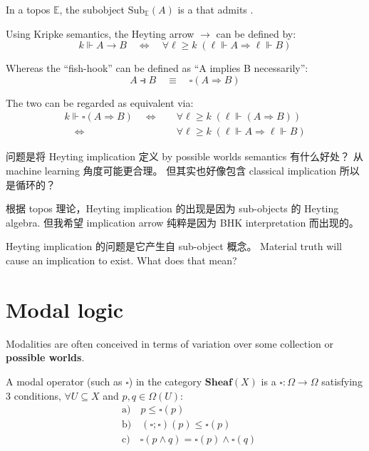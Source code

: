 In a topos $\mathbb{E}$, the subobject $\mathrm{Sub}_{\mathbb{E}}(A)$ is a  that admits .  

Using Kripke semantics, the Heyting arrow $\rightarrow$ can be defined by:
\begin{equation}
k \Vdash A \rightarrow B \quad \Leftrightarrow \quad \forall \ell \ge k \; (\ell \Vdash A \Rightarrow \ell \Vdash B)
\end{equation}

Whereas the ``fish-hook''  can be defined as ``A implies B necessarily'':
\begin{equation}
A \strictif B \quad \equiv \quad \square (A \Rightarrow B) 
\end{equation}

The two can be regarded as equivalent via:
\begin{equation}
\begin{aligned}
k \Vdash \square (A \Rightarrow B) \quad \Leftrightarrow \quad & \forall \ell \ge k \; (\ell \Vdash (A \Rightarrow B)) \\
\quad \Leftrightarrow \quad & \forall \ell \ge k \; (\ell \Vdash A \Rightarrow \ell \Vdash B)
\end{aligned}
\end{equation}

问题是将 Heyting implication 定义 by possible worlds semantics 有什么好处？  从 machine learning 角度可能更合理。  但其实也好像包含 classical implication 所以是循环的？  

根据 topos 理论，Heyting implication 的出现是因为 sub-objects 的 Heyting algebra.  但我希望 implication arrow 纯粹是因为 BHK interpretation 而出现的。 

Heyting implication 的问题是它产生自 sub-object 概念。 Material truth will cause an implication to exist.  What does that mean?  

\section{Modal logic}

Modalities are often conceived in terms of variation over some collection or \textbf{possible worlds}.

A modal operator (such as $\square$) in the category $\mathbf{Sheaf}(X)$ is a  $\square: \Omega \rightarrow \Omega$ satisfying 3 conditions, $\forall U \subseteq X$ and $p, q \in \Omega(U)$:
\begin{equation}
\begin{aligned}
& \mbox{a)} \quad p \le \square (p) \\
& \mbox{b)} \quad (\square ; \square) (p) \le \square (p) \\
& \mbox{c)} \quad \square (p \wedge q) = \square (p) \wedge \square (q)
\end{aligned}
\end{equation}

